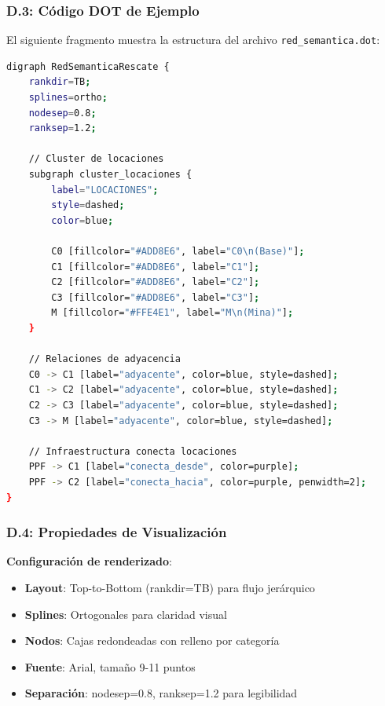 \documentclass[conference]{IEEEtran}
\begin{document}
    \subsubsection*{D.3: Código DOT de Ejemplo}

    El siguiente fragmento muestra la estructura del archivo \texttt{red\_semantica.dot}:

    \begin{lstlisting}[style=anexostyle,caption={Fragmento de la especificación Graphviz DOT},language=bash]
digraph RedSemanticaRescate {
    rankdir=TB;
    splines=ortho;
    nodesep=0.8;
    ranksep=1.2;

    // Cluster de locaciones
    subgraph cluster_locaciones {
        label="LOCACIONES";
        style=dashed;
        color=blue;

        C0 [fillcolor="#ADD8E6", label="C0\n(Base)"];
        C1 [fillcolor="#ADD8E6", label="C1"];
        C2 [fillcolor="#ADD8E6", label="C2"];
        C3 [fillcolor="#ADD8E6", label="C3"];
        M [fillcolor="#FFE4E1", label="M\n(Mina)"];
    }

    // Relaciones de adyacencia
    C0 -> C1 [label="adyacente", color=blue, style=dashed];
    C1 -> C2 [label="adyacente", color=blue, style=dashed];
    C2 -> C3 [label="adyacente", color=blue, style=dashed];
    C3 -> M [label="adyacente", color=blue, style=dashed];

    // Infraestructura conecta locaciones
    PPF -> C1 [label="conecta_desde", color=purple];
    PPF -> C2 [label="conecta_hacia", color=purple, penwidth=2];
}
    \end{lstlisting}

    \subsubsection*{D.4: Propiedades de Visualización}

    \textbf{Configuración de renderizado}:
    \begin{itemize}[leftmargin=*,itemsep=1pt]
    \item \textbf{Layout}: Top-to-Bottom (rankdir=TB) para flujo jerárquico
    \item \textbf{Splines}: Ortogonales para claridad visual
    \item \textbf{Nodos}: Cajas redondeadas con relleno por categoría
    \item \textbf{Fuente}: Arial, tamaño 9-11 puntos
    \item \textbf{Separación}: nodesep=0.8, ranksep=1.2 para legibilidad
    \end{itemize}
\end{document}
